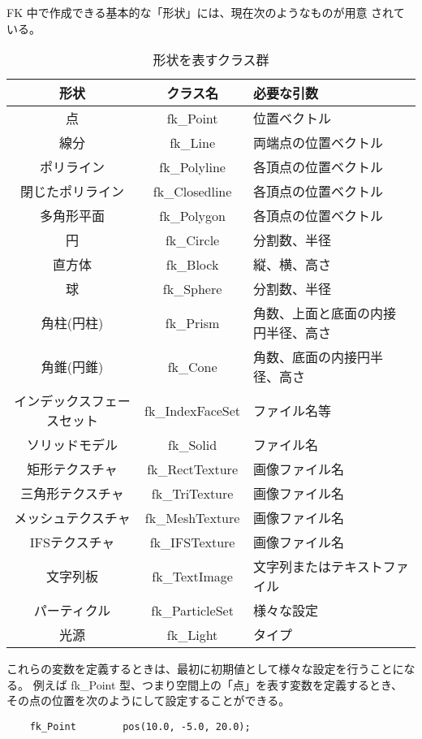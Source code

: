 FK 中で作成できる基本的な「形状」には、現在次のようなものが用意
されている。
\begin{table}[H]
\caption{形状を表すクラス群}
\label{tbl:shapeclass}
\begin{small}
\begin{center}
\begin{tabular}{|c|c|l|}
\hline
形状 & クラス名 & 必要な引数 \\ \hline \hline
点 & fk\_Point & 位置ベクトル \\ \hline
線分 & fk\_Line & 両端点の位置ベクトル \\ \hline
ポリライン & fk\_Polyline & 各頂点の位置ベクトル \\ \hline
閉じたポリライン & fk\_Closedline & 各頂点の位置ベクトル \\ \hline
多角形平面 & fk\_Polygon & 各頂点の位置ベクトル \\ \hline
円 & fk\_Circle & 分割数、半径 \\ \hline
直方体 & fk\_Block & 縦、横、高さ \\ \hline
球 & fk\_Sphere & 分割数、半径 \\ \hline
角柱(円柱) & fk\_Prism & 角数、上面と底面の内接円半径、高さ \\ \hline
角錐(円錐) & fk\_Cone & 角数、底面の内接円半径、高さ \\ \hline
インデックスフェースセット & fk\_IndexFaceSet & ファイル名等 \\ \hline
ソリッドモデル & fk\_Solid & ファイル名 \\ \hline
矩形テクスチャ & fk\_RectTexture & 画像ファイル名 \\ \hline
三角形テクスチャ & fk\_TriTexture & 画像ファイル名 \\ \hline
メッシュテクスチャ & fk\_MeshTexture & 画像ファイル名 \\ \hline
IFSテクスチャ & fk\_IFSTexture & 画像ファイル名 \\ \hline
文字列板 & fk\_TextImage & 文字列またはテキストファイル \\ \hline
パーティクル & fk\_ParticleSet & 様々な設定 \\ \hline
光源 & fk\_Light & タイプ \\ \hline
\end{tabular}
\end{center}
\end{small}
\end{table}

これらの変数を定義するときは、最初に初期値として様々な設定を行うことになる。
例えば fk\_Point 型、つまり空間上の「点」を表す変数を定義するとき、
その点の位置を次のようにして設定することができる。
\\
\begin{screen}
\begin{verbatim}
    fk_Point        pos(10.0, -5.0, 20.0);
\end{verbatim}
\end{screen}
\\

